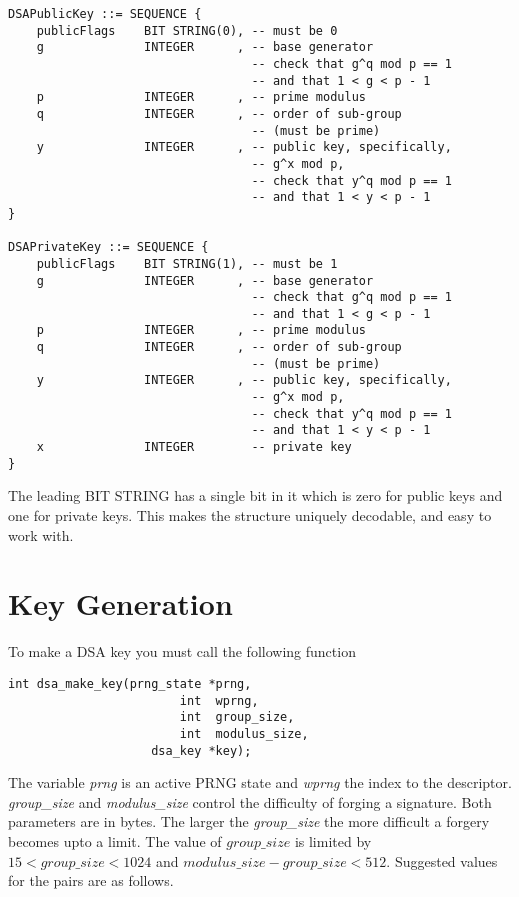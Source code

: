 \documentclass[synpaper]{book}
\newcommand{\mysection}[1]    %
	{                   %
	\section{#1}
   \markboth{\textsf{www.libtom.net}}{\thesection ~ {#1}}
	}
\begin{document}
\begin{verbatim}
DSAPublicKey ::= SEQUENCE {
    publicFlags    BIT STRING(0), -- must be 0
    g              INTEGER      , -- base generator
                                  -- check that g^q mod p == 1
                                  -- and that 1 < g < p - 1
    p              INTEGER      , -- prime modulus
    q              INTEGER      , -- order of sub-group
                                  -- (must be prime)
    y              INTEGER      , -- public key, specifically,
                                  -- g^x mod p,
                                  -- check that y^q mod p == 1
                                  -- and that 1 < y < p - 1
}

DSAPrivateKey ::= SEQUENCE {
    publicFlags    BIT STRING(1), -- must be 1
    g              INTEGER      , -- base generator
                                  -- check that g^q mod p == 1
                                  -- and that 1 < g < p - 1
    p              INTEGER      , -- prime modulus
    q              INTEGER      , -- order of sub-group
                                  -- (must be prime)
    y              INTEGER      , -- public key, specifically,
                                  -- g^x mod p,
                                  -- check that y^q mod p == 1
                                  -- and that 1 < y < p - 1
    x              INTEGER        -- private key
}
\end{verbatim}

The leading BIT STRING has a single bit in it which is zero for public keys and one for private keys.  This makes the structure uniquely decodable,
and easy to work with.

\mysection{Key Generation}
To make a DSA key you must call the following function
\begin{verbatim}
int dsa_make_key(prng_state *prng,
                        int  wprng,
                        int  group_size,
                        int  modulus_size,
                    dsa_key *key);
\end{verbatim}
The variable \textit{prng} is an active PRNG state and \textit{wprng} the index to the descriptor.  \textit{group\_size} and
\textit{modulus\_size} control the difficulty of forging a signature.  Both parameters are in bytes.  The larger the
\textit{group\_size} the more difficult a forgery becomes upto a limit.  The value of $group\_size$ is limited by
$15 < group\_size < 1024$ and $modulus\_size - group\_size < 512$.  Suggested values for the pairs are as follows.
\end{document}
